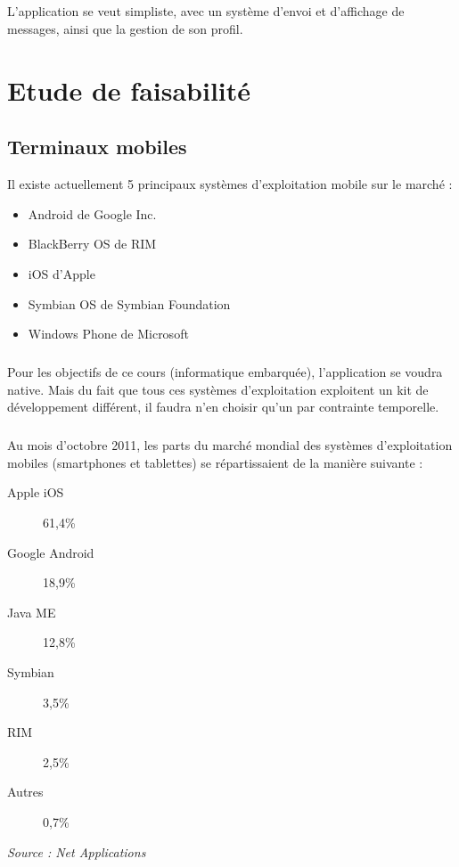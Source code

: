 \documentclass[a4paper,12pt]{report}
\begin{document}
\begin{onehalfspace}
	\paragraph*{}
	L'application se veut simpliste, avec un système d'envoi et d'affichage de messages, ainsi que la gestion de son profil.
	
	\chapter*{Etude de faisabilité}
	
	\section*{Terminaux mobiles}
	
	Il existe actuellement 5 principaux systèmes d'exploitation mobile sur le marché :
	\begin{itemize}
		\item Android de Google Inc.
		\item BlackBerry OS de RIM
		\item iOS d'Apple
		\item Symbian OS de Symbian Foundation
		\item Windows Phone de Microsoft
	\end{itemize}
	
	\paragraph*{}
	Pour les objectifs de ce cours (informatique embarquée), l'application se voudra native. Mais du fait que tous ces systèmes d'exploitation exploitent un kit de développement différent, il faudra n'en choisir qu'un par contrainte temporelle.
	
	\paragraph*{}
	Au mois d'octobre 2011, les parts du marché mondial des systèmes d'exploitation mobiles (smartphones et tablettes) se répartissaient de la manière suivante :
	\begin{description}
		\item[Apple iOS] 61,4\%
		\item[Google Android] 18,9\%
		\item[Java ME] 12,8\%
		\item[Symbian] 3,5\%
		\item[RIM] 2,5\%
		\item[Autres] 0,7\%
	\end{description}
	\emph{Source : Net Applications}
	

\end{onehalfspace}
\end{document}
